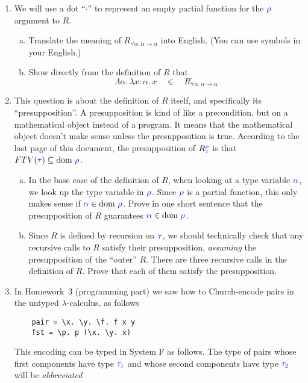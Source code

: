 \documentclass{article}
\theoremstyle{definition}
\newcommand{\meta}[1]{{\color{blue}#1}}
\newcommand{\dom}[1]{\ensuremath{\text{dom}\ #1}}
\begin{document}
\begin{enumerate}[start=1,label={{\bf Problem \arabic*}.},ref=\arabic*,left=0pt..0pt,widest*=10,align=left,itemindent=*]
\clearpage
\item We will use a dot ``$\cdot$'' to represent an empty partial function for
  the $\meta{\rho}$ argument to $R$.
  \begin{enumerate}[(a),left=1em]
  \item Translate the meaning of $R_{\forall\alpha.\, \alpha\to\alpha}^{\cdot}$ into English. (You can use symbols in your English.)
  \item
  Show directly from the definition of $R$ that
  \[
    \Lambda\alpha.\,\lambda x:\alpha.\, x \quad\in\quad R_{\forall\alpha.\, \alpha\to\alpha}^{\cdot}
  \]
  \end{enumerate}
\item This question is about the definition of $R$ itself, and specifically its
  ``presupposition''.  A presupposition is kind of like a precondition, but on a
  mathematical object instead of a program.  It means that the mathematical
  object doesn't make sense unless the presupposition is true. According to the
  last page of this document, the presupposition of
  $R_{\meta{\tau}}^{\meta{\rho}}$ is that
  $FTV(\meta{\tau})\subseteq\dom{\meta{\rho}}$.
  \begin{enumerate}[(a),left=1em]
  \item In the base case of the definition of $R$, when looking at a type
    variable $\meta{\alpha}$, we look up the type variable in
    $\meta{\rho}$. Since $\meta{\rho}$ is a partial function, this only makes
    sense if $\meta{\alpha}\in\dom{\meta{\rho}}$.  Prove in one short sentence
    that the presupposition of $R$ guarantees
    $\meta{\alpha}\in\dom{\meta{\rho}}$.
  \item Since $R$ is defined by recursion on $\meta{\tau}$, we should technically check
    that any recursive calls to $R$ satisfy their presupposition,
    \emph{assuming} the presupposition of the ``outer'' $R$. There are three
    recursive calls in the definition of $R$. Prove that each of them satisfy
    the presupposition.
  \end{enumerate}
\item In Homework~3 (programming part) we saw how to Church-encode pairs in the
  untyped $\lambda$-calculus, as follows
\begin{verbatim}
    pair = \x. \y. \f. f x y
    fst = \p. p (\x. \y. x)
\end{verbatim}
  This encoding can be typed in System F as follows. The type of pairs whose
  first components have type $\meta{\tau_1}$ and whose second components have
  type $\meta{\tau_2}$ will be \emph{abbreviated}

\end{enumerate}
\end{document}
